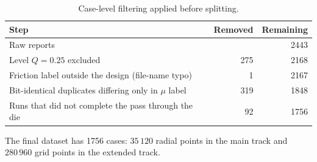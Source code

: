\begin{table}[htbp]
\centering\small
\caption{Case-level filtering applied before splitting.}
\label{tab:filtering}
\begin{tabular}{@{}lrr@{}}
\toprule
Step & Removed & Remaining \\
\midrule
Raw reports                                            &     & 2443 \\ %
Level $Q=0.25$ excluded                                & 275 & 2168 \\ %
Friction label outside the design (file-name typo)     & 1   & 2167 \\ %
Bit-identical duplicates differing only in $\mu$ label & 319 & 1848 \\ %
Runs that did not complete the pass through the die    & 92  & 1756 \\ %
\bottomrule
\end{tabular}
\end{table}

The final dataset has 1756 cases: $35\,120$ radial points in the main track and $280\,960$ grid points in the extended track. %

